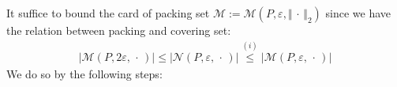 \documentclass[11pt,a4paper]{article}
\numberwithin{equation}{section}%
\begin{document}

It suffice to bound the card of packing set $ \mathcal{M}:=\mathcal{M}(P,\varepsilon ,\left\Vert \, \cdot \,  \right\Vert _2) $ since we have the relation between packing and covering set: 
\begin{align*}
    \left\vert \mathcal{M}(P,2\varepsilon ,\, \cdot \, ) \right\vert\leq \left\vert \mathcal{N}(P,\varepsilon ,\, \cdot \, ) \right\vert \mathop{ \leq }\limits^{(i)}  \left\vert \mathcal{M}(P,\varepsilon ,\, \cdot \, ) \right\vert
\end{align*}
We do so by the following steps:
\end{document}
